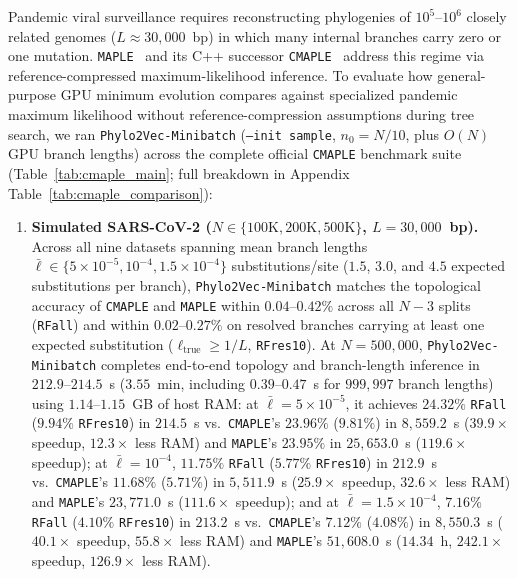 \documentclass[11pt,a4paper]{article}
\makeatletter
\DeclareRobustCommand{\_}{\ifmmode\nfss@text{\textunderscore}\else\textunderscore\allowbreak\fi}
\theoremstyle{definition}
\makeatother
\begin{document}
Pandemic viral surveillance requires reconstructing phylogenies of $10^5\text{--}10^6$ closely related genomes ($L\approx30{,}000$~bp) in which many internal branches carry zero or one mutation.
\texttt{MAPLE}~\cite{demaio2023maple} and its C++ successor \texttt{CMAPLE}~\cite{lytrong2024cmaple} address this regime via reference-compressed maximum-likelihood inference.
To evaluate how general-purpose GPU minimum evolution compares against specialized pandemic maximum likelihood without reference-compression assumptions during tree search, we ran \texttt{Phylo2Vec-Minibatch} (\texttt{--init sample}, $n_0=N/10$, plus $O(N)$ GPU branch lengths) across the complete official \texttt{CMAPLE} benchmark suite~\cite{lytrong2024cmaple} (Table~\ref{tab:cmaple_main}; full breakdown in Appendix Table~\ref{tab:cmaple_comparison}):
\begin{enumerate}
 \item \textbf{Simulated SARS-CoV-2 ($N\in\{100\text{K},200\text{K},500\text{K}\}$, $L=30{,}000$~bp).} Across all nine datasets spanning mean branch lengths $\bar\ell\in\{5\times10^{-5},10^{-4},1.5\times10^{-4}\}$ substitutions/site ($1.5$, $3.0$, and $4.5$ expected substitutions per branch), \texttt{Phylo2Vec-Minibatch} matches the topological accuracy of \texttt{CMAPLE} and \texttt{MAPLE} within $0.04\text{--}0.42\%$ across all $N-3$ splits (\texttt{RF\_all}) and within $0.02\text{--}0.27\%$ on resolved branches carrying at least one expected substitution ($\ell_{\mathrm{true}}\geq 1/L$, \texttt{RF\_res10}). At $N=500{,}000$, \texttt{Phylo2Vec-Minibatch} completes end-to-end topology and branch-length inference in $212.9\text{--}214.5$~s ($3.55$~min, including $0.39\text{--}0.47$~s for $999{,}997$ branch lengths) using $1.14\text{--}1.15$~GB of host RAM: at $\bar\ell=5\times10^{-5}$, it achieves $24.32\%$ \texttt{RF\_all} ($9.94\%$ \texttt{RF\_res10}) in $214.5$~s vs.\ \texttt{CMAPLE}'s $23.96\%$ ($9.81\%$) in $8{,}559.2$~s ($39.9\times$ speedup, $12.3\times$ less RAM) and \texttt{MAPLE}'s $23.95\%$ in $25{,}653.0$~s ($119.6\times$ speedup); at $\bar\ell=10^{-4}$, $11.75\%$ \texttt{RF\_all} ($5.77\%$ \texttt{RF\_res10}) in $212.9$~s vs.\ \texttt{CMAPLE}'s $11.68\%$ ($5.71\%$) in $5{,}511.9$~s ($25.9\times$ speedup, $32.6\times$ less RAM) and \texttt{MAPLE}'s $23{,}771.0$~s ($111.6\times$ speedup); and at $\bar\ell=1.5\times10^{-4}$, $7.16\%$ \texttt{RF\_all} ($4.10\%$ \texttt{RF\_res10}) in $213.2$~s vs.\ \texttt{CMAPLE}'s $7.12\%$ ($4.08\%$) in $8{,}550.3$~s ($40.1\times$ speedup, $55.8\times$ less RAM) and \texttt{MAPLE}'s $51{,}608.0$~s ($14.34$~h, $242.1\times$ speedup, $126.9\times$ less RAM).

\end{enumerate}
\end{document}
